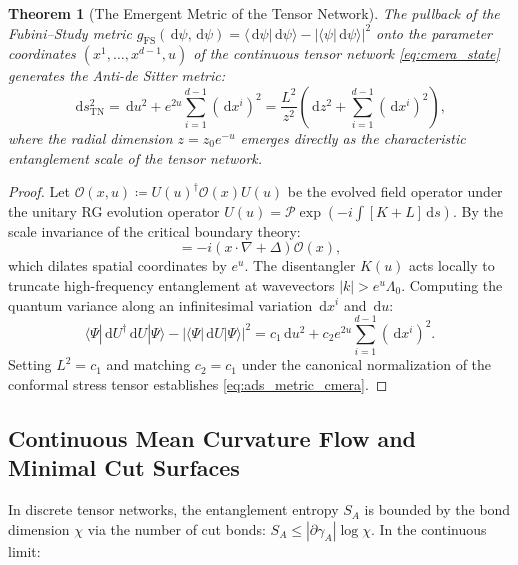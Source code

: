 \documentclass[11pt,a4paper,reqno]{amsart}
\newtheorem{theorem}{Theorem}[section]
\theoremstyle{definition}
\numberwithin{equation}{section}
\newcommand{\dif}{\,\mathrm{d}}
\begin{document}
\begin{theorem}[The Emergent Metric of the Tensor Network]
\label{thm:tensor_network_metric}
The pullback of the Fubini--Study metric $g_{\mathrm{FS}}(\dif \psi, \dif \psi) = \langle \dif \psi | \dif \psi \rangle - |\langle \psi | \dif \psi \rangle|^2$ onto the parameter coordinates $(x^1, \dots, x^{d-1}, u)$ of the continuous tensor network \eqref{eq:cmera_state} generates the Anti-de Sitter metric:
\begin{equation}
    \label{eq:ads_metric_cmera}
    \dif s_{\mathrm{TN}}^2 = \dif u^2 + e^{2u} \sum_{i=1}^{d-1} (\dif x^i)^2 = \frac{L^2}{z^2}\left( \dif z^2 + \sum_{i=1}^{d-1} (\dif x^i)^2 \right),
\end{equation}
where the radial dimension $z = z_0 e^{-u}$ emerges directly as the characteristic entanglement scale of the tensor network.
\end{theorem}
\begin{proof}
Let $\mathcal{O}(x, u) \coloneqq U(u)^\dagger \mathcal{O}(x) U(u)$ be the evolved field operator under the unitary RG evolution operator $U(u) = \mathcal{P} \exp(-i \int [K + L] \dif s)$. By the scale invariance of the critical boundary theory:
\begin{equation}
    [L, \mathcal{O}(x)] = -i (x \cdot \nabla + \Delta) \mathcal{O}(x),
\end{equation}
which dilates spatial coordinates by $e^u$. The disentangler $K(u)$ acts locally to truncate high-frequency entanglement at wavevectors $|k| > e^u \Lambda_0$. Computing the quantum variance along an infinitesimal variation $\dif x^i$ and $\dif u$:
\begin{equation}
    \langle \Psi | \dif U^\dagger \dif U | \Psi \rangle - |\langle \Psi | \dif U | \Psi \rangle|^2 = c_1 \dif u^2 + c_2 e^{2u} \sum_{i=1}^{d-1} (\dif x^i)^2.
\end{equation}
Setting $L^2 = c_1$ and matching $c_2 = c_1$ under the canonical normalization of the conformal stress tensor establishes \eqref{eq:ads_metric_cmera}.
\end{proof}

\subsection{Continuous Mean Curvature Flow and Minimal Cut Surfaces}
In discrete tensor networks, the entanglement entropy $S_A$ is bounded by the bond dimension $\chi$ via the number of cut bonds: $S_A \le |\partial \gamma_A| \log \chi$. In the continuous limit:
\end{document}
